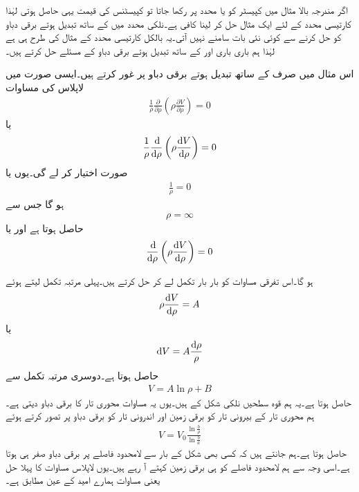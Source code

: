 اگر مندرجہ بالا مثال میں کپیسٹر کو  یا  محدد پر رکھا جاتا تو کپیسٹنس کی قیمت یہی حاصل ہوتی لہٰذا کارتیسی محدد کے لئے ایک مثال حل کر لینا کافی ہے۔نلکی محدد میں  کے ساتھ تبدیل ہوتے برقی دباو کو حل کرنے سے کوئی نئی بات سامنے نہیں آتی۔یہ بالکل کارتیسی محدد کے مثال کی طرح ہی ہے لہٰذا ہم باری باری  اور  کے ساتھ تبدیل ہوتے برقی دباو کے مسئلے حل کرتے ہیں۔


اس مثال میں صرف  کے ساتھ تبدیل ہوتے برقی دباو پر غور کرتے ہیں۔ایسی صورت میں لاپلاس کی مساوات
\begin{align*}
\frac{1}{\rho} \frac{\partial}{\partial \rho} \left(\rho \frac{\partial V}{\partial \rho} \right)=0
\end{align*}
یا
\begin{align}\label{مساوات_لاپلاس_ہم_محوری_لاپلاسی}
\frac{1}{\rho}\frac{\dif}{\dif \rho} \left(\rho \frac{\dif V}{\dif \rho} \right)=0
\end{align}
صورت اختیار کر لے گی۔یوں یا
\begin{align*}
\frac{1}{\rho}=0
\end{align*}
ہو گا جس سے
\begin{align}\label{مساوات_لاپلاس_ہم_محوری_لاپلاسی_پہلا-حل}
\rho=\infty
\end{align}
حاصل ہوتا ہے اور یا
\begin{align}\label{مساوات_لاپلاس_ہم_محوری_لاپلاسی_ب}
\frac{\dif}{\dif \rho} \left(\rho \frac{\dif V}{\dif \rho} \right)=0
\end{align}

ہو گا۔اس تفرقی مساوات کو بار بار تکمل لے کر حل کرتے ہیں۔پہلی مرتبہ تکمل لیتے ہوئے
\begin{align*}
\rho \frac{\dif V}{\dif \rho}=A
\end{align*}
یا
\begin{align*}
\dif V=A \frac{\dif \rho}{\rho}
\end{align*}
حاصل ہوتا ہے۔دوسری مرتبہ تکمل سے
\begin{align*}
V=A \ln \rho+B
\end{align*}
حاصل ہوتا ہے۔یہ ہم قوہ سطحیں نلکی شکل کے ہیں۔یوں یہ مساوات محوری تار کا برقی دباو دیتی ہے۔ہم محوری تار کے بیرونی تار  کو برقی زمین اور اندرونی تار  کو  برقی دباو پر تصور کرتے ہوئے
\begin{align}\label{مساوات_لاپلاس_ہم_محوری_لاپلاسی_ب_حل}
V=V_0 \frac{\ln \frac{b}{\rho} }{\ln \frac{b}{a} }
\end{align}
حاصل ہوتا ہے۔ہم جانتے ہیں کہ کسی بھی شکل کے بار سے لامحدود فاصلے پر برقی دباو صفر ہی ہوتا ہے۔اسی وجہ سے ہم لامحدود فاصلے کو ہی برقی زمین کہتے آ رہے ہیں۔یوں لاپلاس مساوات کا پہلا حل یعنی مساوات  ہمارے امید کے عین مطابق ہے۔

